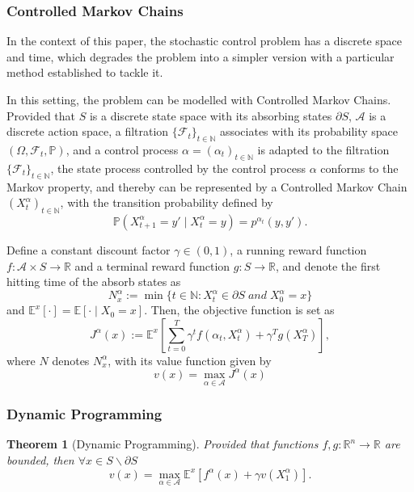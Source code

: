 \documentclass[11pt,twoside]{article}
\newtheorem{Theorem}{Theorem}
\numberwithin{Theorem}{section}
\numberwithin{Definition}{section}
\numberwithin{Lemma}{section}
\numberwithin{Algorithm}{section}
\numberwithin{equation}{section}
\begin{document}
\subsubsection{Controlled Markov Chains}

In the context of this paper, the stochastic control problem has a discrete space and time, which degrades the problem into a simpler version with a particular method established to tackle it.

In this setting, the problem can be modelled with Controlled Markov Chains. Provided that $S$ is a discrete state space with its absorbing states $\partial S$, $\mathcal{A}$ is a discrete action space, a filtration $\{\mathcal{F}_t\}_{t\in\mathbb{N}}$ associates with its probability space $(\Omega,\mathcal{F}_t,\mathbb{P})$, and a control process $\alpha=\left(\alpha_t\right)_{t\in\mathbb{N}}$ is adapted to the filtration $\{\mathcal{F}_t\}_{t\in\mathbb{N}}$, the state process controlled by the control process $\alpha$ conforms to the Markov property, and thereby can be represented by a Controlled Markov Chain $(X_{t}^{\alpha})_{t\in\mathbb{N}}$, with the transition probability defined by
\begin{equation*}
\mathbb{P}({X}_{t+1}^{\alpha}=y'\mid {X}_{t}^{\alpha}=y)=p^{\alpha_t}(y,y').
\end{equation*}

Define a constant discount factor $\gamma\in(0,1)$, a running reward function $f:\mathcal{A}\times S\rightarrow\mathbb{R}$ and a terminal reward function $g:S \rightarrow\mathbb{R}$, and denote the first hitting time of the absorb states as
\begin{equation*}
N^{\alpha}_x:=\min\{t\in\mathbb{N} :X_t^{\alpha}\in\partial S\;and\;X_0^{\alpha}=x\}
\end{equation*}
and $\mathbb{E}^x[\cdot]=\mathbb{E}[\cdot\mid X_0=x]$. Then, the objective function is set as
\begin{equation*}
J^{\alpha}(x):=\mathbb{E}^x\left[\sum_{t=0}^T\gamma^tf(\alpha_t,X_t^{\alpha})+\gamma^Tg(X_T^{\alpha})\right],   
\end{equation*}
where $N$ denotes $N^{\alpha}_x$, with its value function given by
\begin{equation*}
    v(x)=\max_{\alpha\in\mathcal{A}}J^{\alpha}(x)
\end{equation*}

\subsubsection{Dynamic Programming}
\begin{Theorem}[Dynamic Programming]\label{The:DP}
Provided that functions $f,g:\mathbb{R}^n\rightarrow\mathbb{R}$ are bounded, then $\forall x\in S\backslash\partial S$
$$
v(x)=\max_{\alpha\in\mathcal{A}}\mathbb{E}^x\left[f^{\alpha}(x)+\gamma v(X_1^{\alpha})\right].
$$
\end{Theorem}
\end{document}
